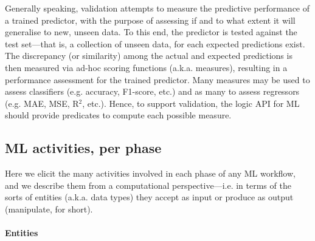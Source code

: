 \documentclass[
]{ceurart}
\begin{document}
Generally speaking, validation attempts to measure the predictive performance of a trained predictor, with the purpose of assessing if and to what extent it will generalise to new, unseen data.
%
To this end, the predictor is tested against the test set---that is, a collection of unseen data, for each expected predictions exist.
%
The discrepancy (or similarity) among the actual and expected predictions is then measured via ad-hoc scoring functions (a.k.a. measures), resulting in a performance assessment for the trained predictor.
%
Many measures may be used to assess classifiers (e.g. accuracy, F1-score, etc.) and as many to assess regressors (e.g. MAE, MSE, R$^2$, etc.).
%
Hence, to support validation, the logic API for ML should provide predicates to compute each possible measure.

\subsection{ML activities, per phase}
\label{ssec:modelling}

Here we elicit the many activities involved in each phase of any ML workflow, and we describe them from a computational perspective---i.e. in terms of the sorts of entities (a.k.a. data types) they accept as input or produce as output (manipulate, for short).

\paragraph{Entities}
\end{document}
